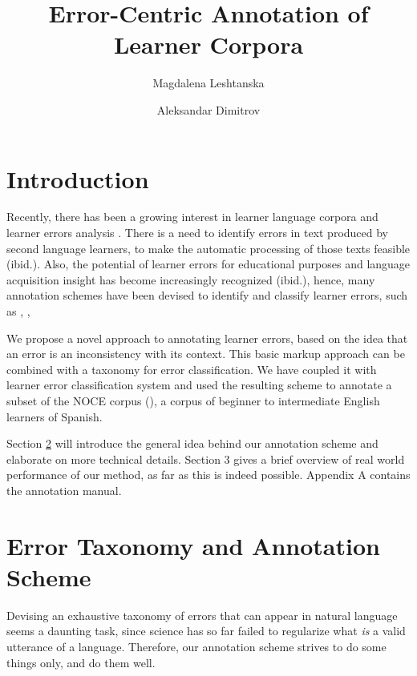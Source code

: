 \documentclass{article}
\author{Magdalena Leshtanska \and Aleksandar Dimitrov}
\title{Error-Centric Annotation of Learner Corpora}
\begin{document}
\maketitle

\newtheorem{thm}{Theorem}[section]
\newtheorem{definition}[thm]{Definition}

\tableofcontents
{}

\section{Introduction}\label{sec:intro}

Recently, there has been a growing interest in learner language corpora and
learner errors analysis \cite{nessel}. There is a need to identify errors in
text produced by second language learners, to make the automatic processing of
those texts feasible (ibid.). Also, the potential of learner errors for
educational purposes and language acquisition insight has become increasingly
recognized (ibid.), hence, many annotation schemes have been devised to
identify and classify learner errors, such as \cite{negrillo}, \cite{CLC},
\cite{ludeling}

We propose a novel approach to annotating learner errors, based on the idea that
an error is an inconsistency with its context. This basic markup approach
can be  combined with a taxonomy for error classification. We
have coupled it with learner error  classification system and used the resulting
scheme to annotate a subset of the NOCE corpus (\cite{negrilloph}), a corpus of
beginner to intermediate English learners of Spanish.

Section \ref{sec:scheme} will introduce the general idea behind our annotation
scheme and elaborate on more technical details. Section 3  gives a brief
overview of real world performance of our method, as far as this is indeed
possible. Appendix A contains the annotation manual.

\section{Error Taxonomy and Annotation Scheme}\label{sec:scheme}

Devising an exhaustive taxonomy of errors that can appear in natural language
seems a daunting task, since science has so far failed to regularize what
\textit{is} a valid utterance of a language.  Therefore, our annotation scheme
strives  to  do some things only, and do them well.
\end{document}
